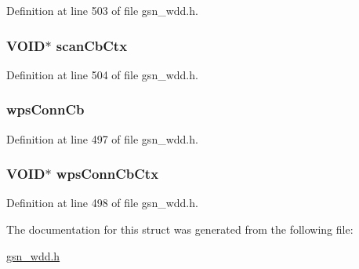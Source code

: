 Definition at line 503 of file gsn\_\-wdd.h.

\hypertarget{a00281_ac9a86068d55c66bc14d984dc970da999}{
\subsubsection[{scanCbCtx}]{\setlength{\rightskip}{0pt plus 5cm}VOID$\ast$ {\bf scanCbCtx}}}
\label{a00281_ac9a86068d55c66bc14d984dc970da999}


Definition at line 504 of file gsn\_\-wdd.h.

\hypertarget{a00281_aac3de6f35860b82b824d429d408f246c}{
\subsubsection[{wpsConnCb}]{ {\bf wpsConnCb}}}
\label{a00281_aac3de6f35860b82b824d429d408f246c}


Definition at line 497 of file gsn\_\-wdd.h.

\hypertarget{a00281_aa2c8d58d2156956a87b7a75c25a18bae}{
\subsubsection[{wpsConnCbCtx}]{\setlength{\rightskip}{0pt plus 5cm}VOID$\ast$ {\bf wpsConnCbCtx}}}
\label{a00281_aa2c8d58d2156956a87b7a75c25a18bae}


Definition at line 498 of file gsn\_\-wdd.h.



The documentation for this struct was generated from the following file:\begin{DoxyCompactItemize}
\item 
\hyperlink{a00603}{gsn\_\-wdd.h}\end{DoxyCompactItemize}
